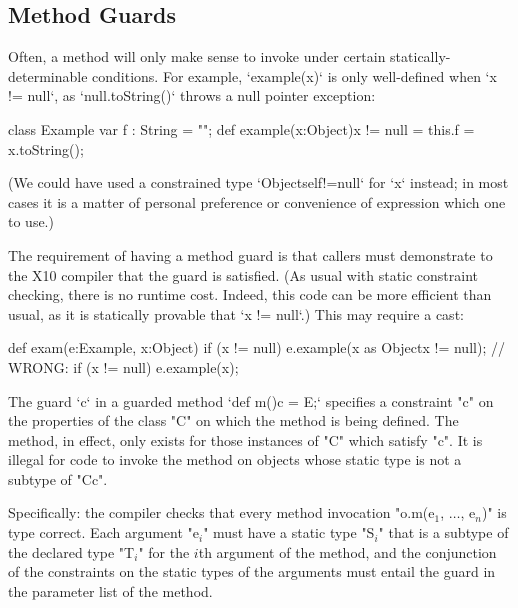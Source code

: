\subsection{Method Guards}
\label{MethodGuard}

Often, a method will only make sense to invoke under certain
statically-determinable conditions.  For example, \xcd`example(x)` is only
well-defined when \xcd`x != null`, as \xcd`null.toString()` throws a null
pointer exception: 
% 
\begin{xten}
class Example {
   var f : String = "";
   def example(x:Object){x != null} = {
      this.f = x.toString();
   }
}
\end{xten}
%
\noindent
(We could have used a constrained type \xcd`Object{self!=null}` for \xcd`x`
instead; in
most cases it is a matter of personal preference or convenience of expression
which one to use.) 

The requirement of having a method guard is that callers must demonstrate to
the X10
compiler that the guard is satisfied.  (As usual with static constraint
checking, there is no runtime cost.  Indeed, this code can be more efficient
than usual, as it is statically provable that \xcd`x != null`.)
This may require a cast: 
% 
\begin{xten}
  def exam(e:Example, x:Object) {
    if (x != null) 
       e.example(x as Object{x != null});
    // WRONG: if (x != null) e.example(x);
  }
\end{xten}



The guard \xcd`{c}` 
in a guarded method 
\xcd`def m(){c} = E;`
specifies a constraint \xcd"c" on the
properties of the class \xcd"C" on which the method is being defined. The
method, in effect, only exists  for those instances of \xcd"C" which satisfy
\xcd"c".  It is 
illegal for code to invoke the method on objects whose static type is
not a subtype of \xcd"C{c}".

Specifically: 
    the compiler checks that every method invocation
    \xcdmath"o.m(e$_1$, $\dots$, e$_n$)"
    is type correct. Each argument
    \xcdmath"e$_i$" must have a
    static type \xcdmath"S$_i$" that is a subtype of the declared type
    \xcdmath"T$_i$" for the $i$th
    argument of the method, and the conjunction of the constraints on the
    static types 
    of the arguments must entail the guard in the parameter list
    of the method.

